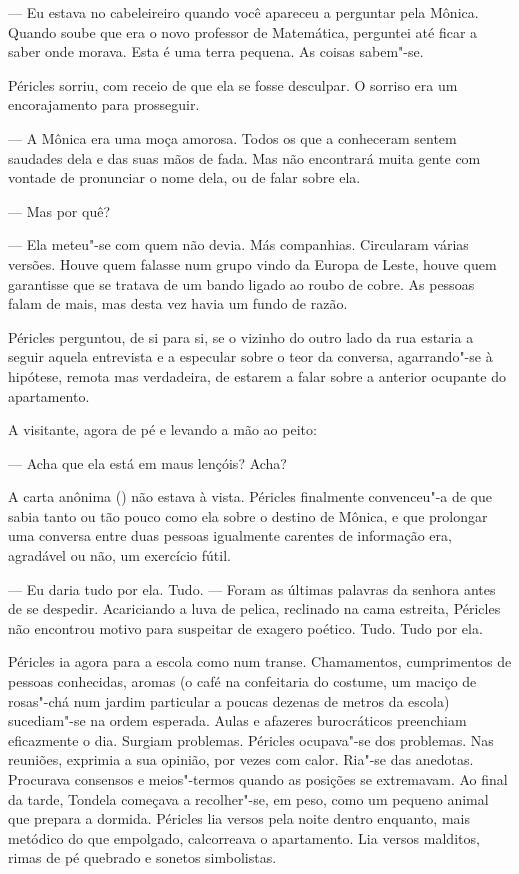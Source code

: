 --- Eu estava no cabeleireiro quando você apareceu a perguntar pela
  Mônica. Quando soube que era o novo professor de Matemática, perguntei
  até ficar a saber onde morava. Esta é uma terra pequena. As coisas
  sabem"-se.


Péricles sorriu, com receio de que ela se fosse desculpar. O sorriso era
um encorajamento para prosseguir.

--- A Mônica era uma moça amorosa. Todos os que a conheceram sentem
  saudades dela e das suas mãos de
fada. Mas não encontrará muita gente com vontade de pronunciar o nome
dela, ou de falar sobre ela.

--- Mas por quê?

--- Ela meteu"-se com quem não devia. Más companhias. Circularam várias
  versões. Houve quem falasse num grupo vindo da Europa de Leste, houve
  quem garantisse que se tratava de um bando ligado ao roubo de cobre.
  As pessoas falam de mais, mas desta vez havia um fundo de razão.


Péricles perguntou, de si para si, se o vizinho do outro lado da rua
estaria a seguir aquela entrevista e a especular sobre o teor da
conversa, agarrando"-se à hipótese, remota mas verdadeira, de estarem a
falar sobre a anterior ocupante do apartamento.

A visitante, agora de pé e levando a mão ao peito:

--- Acha que ela está em maus lençóis? Acha?


A carta anônima () não estava à vista. Péricles finalmente convenceu"-a de
que sabia tanto ou tão pouco como ela sobre o destino de Mônica, e que
prolongar uma conversa entre duas pessoas igualmente carentes de
informação era, agradável ou não, um exercício fútil.

--- Eu daria tudo por ela. Tudo. --- Foram as últimas palavras da
  senhora antes de se despedir. Acariciando a luva de pelica, reclinado
  na cama estreita, Péricles não encontrou motivo para suspeitar de
  exagero poético. Tudo. Tudo por ela.


Péricles ia agora para a escola como num transe. Chamamentos,
cumprimentos de pessoas conhecidas, aromas (o café na confeitaria do
costume, um maciço de rosas"-chá num jardim particular a poucas dezenas
de metros da escola) sucediam"-se na ordem esperada. Aulas e afazeres
burocráticos preenchiam eficazmente o dia. Surgiam problemas. Péricles ocupava"-se dos
problemas. Nas reuniões, exprimia a sua opinião, por vezes com calor.
Ria"-se das anedotas. Procurava consensos e meios"-termos quando as
posições se extremavam. Ao final da tarde, Tondela começava a
recolher"-se, em peso, como um pequeno animal que prepara a dormida.
Péricles lia versos pela noite dentro enquanto, mais metódico do que
empolgado, calcorreava o apartamento. Lia versos malditos, rimas de pé
quebrado e sonetos simbolistas.

